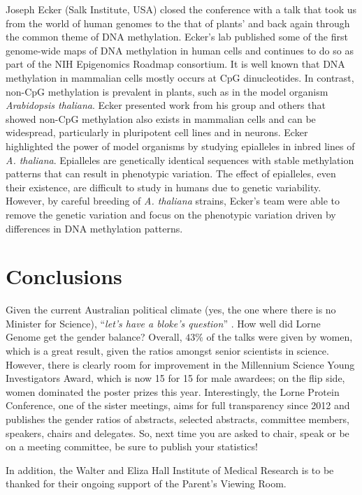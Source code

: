 \documentclass[twocolumn]{bmcart}%
\begin{document}
Joseph Ecker (Salk Institute, USA) closed the conference with a talk that took us from the world of human genomes to the that of plants' and back again through the common theme of DNA methylation. Ecker's lab published some of the first genome-wide maps of DNA methylation in human cells and continues to do so as part of the NIH Epigenomics Roadmap consortium. It is well known that DNA methylation in mammalian cells mostly occurs at CpG dinucleotides.  In contrast, non-CpG methylation is prevalent in plants, such as in the model organism \emph{Arabidopsis thaliana}. Ecker presented work from his group and others that showed non-CpG methylation also exists in mammalian cells and can be widespread, particularly in pluripotent cell lines and in neurons. Ecker highlighted the power of model organisms by studying epialleles in inbred lines of \emph{A. thaliana}. Epialleles are genetically identical sequences with stable methylation patterns that can result in phenotypic variation. The effect of epialleles, even their existence, are difficult to study in humans due to genetic variability. However, by careful breeding of \emph{A. thaliana} strains, Ecker's team were able to remove the genetic variation and focus on the phenotypic variation driven by differences in DNA methylation patterns.

\section*{Conclusions}

Given the current Australian political climate (yes, the one where there is no Minister for Science), ``{\em let's have a bloke's question}'' \cite{INDEPENDENT}.  How well did Lorne Genome get the gender balance?  Overall, $43\%$ of the talks were given by women, which is a great result, given the ratios amongst senior scientists in science.  However, there is clearly room for improvement in the Millennium Science Young Investigators Award, which is now 15 for 15 for male awardees; on the flip side, women dominated the poster prizes this year.  Interestingly, the Lorne Protein Conference, one of the sister meetings, aims for full transparency since 2012 and publishes the gender ratios of abstracts, selected abstracts, committee members, speakers, chairs and delegates.  So, next time you are asked to chair, speak or be on a meeting committee, be sure to publish your statistics!

In addition, the Walter and Eliza Hall Institute of Medical Research is to be thanked for their ongoing support of the Parent's Viewing Room.
\end{document}
